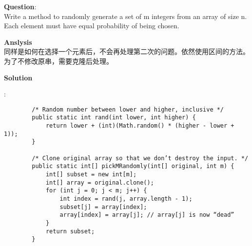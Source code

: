     
\begin{description}
    \item{\textbf{Question}}:\\%
		Write a method to randomly generate a set of m integers from an array of size n. Each element must have equal probability of being chosen.

    \item{\textbf{Anslysis}}\\
		同样是如何在选择一个元素后，不会再处理第二次的问题。依然使用区间的方法。\\
		为了不修改原串，需要克隆后处理。
		
    \item{\textbf{Solution}}
	\item{} : \\
		\begin{lstlisting}
		/* Random number between lower and higher, inclusive */
		public static int rand(int lower, int higher) {
			return lower + (int)(Math.random() * (higher - lower + 1));
		}

		/* Clone original array so that we don’t destroy the input. */
		public static int[] pickMRandomly(int[] original, int m) {
			int[] subset = new int[m];
			int[] array = original.clone();
			for (int j = 0; j < m; j++) {
				int index = rand(j, array.length - 1);
				subset[j] = array[index];
				array[index] = array[j]; // array[j] is now “dead”
			}
			return subset;
		}
		\end{lstlisting}

\end{description}

